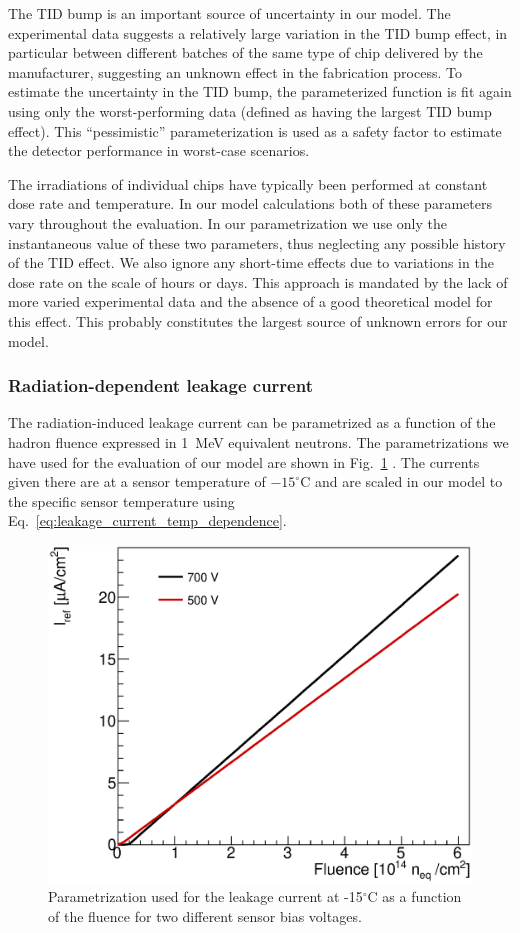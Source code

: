 The TID bump is an important source of uncertainty in our model. The experimental data suggests
a relatively large variation in the TID bump effect, in particular
between different batches of the same type of chip delivered by the manufacturer, suggesting an unknown
effect in the fabrication process. To estimate the uncertainty in the TID bump,
the parameterized function is fit again using only the worst-performing data (defined as having the
largest TID bump effect). This ``pessimistic'' parameterization is used as a safety factor to estimate
the detector performance in worst-case scenarios.

The irradiations of individual chips have typically been performed at constant dose rate and temperature. In our model calculations both of these parameters vary throughout the evaluation. In our parametrization we use only the instantaneous value of these two parameters, thus neglecting any possible history of the TID effect. We also ignore any short-time effects due to variations in the dose rate on the scale of hours or days. This approach is mandated by the lack of more varied experimental data and the absence of a good theoretical model for this effect. This probably constitutes the largest source of unknown errors for our model.

\subsubsection{Radiation-dependent leakage current}

The radiation-induced leakage current can be parametrized as a function of the hadron fluence expressed in 1~MeV equivalent neutrons. The parametrizations we have used for the evaluation of our model are shown in Fig.~\ref{fig:leakage} \cite{mikestikova}. The currents given there are at a sensor temperature of $-15^\circ$C and are scaled in our model to the specific sensor temperature using Eq.~\ref{eq:leakage_current_temp_dependence}. 

\begin{figure}[ht]
\centering
\includegraphics[width=0.5\linewidth]{figures/SensorLeakagePower.eps}
\caption{Parametrization used for the leakage current at -15$^\circ$C as a function of the fluence for two different sensor bias voltages.}
\label{fig:leakage}
\end{figure}






